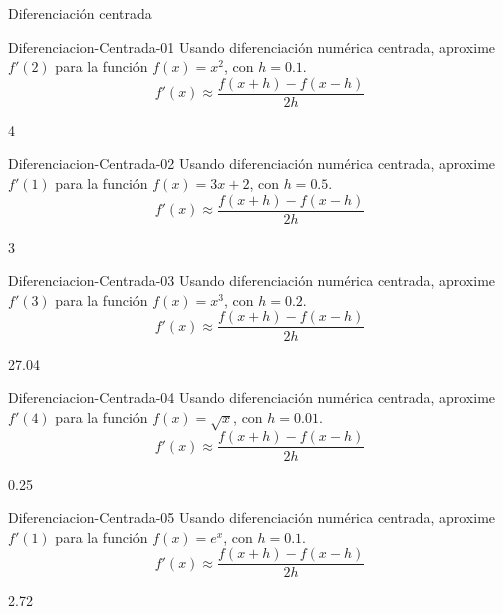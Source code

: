 \documentclass[a4,11pt]{aleph-notas}
\begin{document}
\begin{quiz}{Diferenciación centrada}
\begin{numerical}[tolerance=0.01]%
    {Diferenciacion-Centrada-01}
    Usando diferenciación numérica centrada, aproxime \( f'(2) \) para la función \( f(x)=x^2 \), con \( h=0.1 \).
    \[
        f'(x)\approx \frac{f(x+h)-f(x-h)}{2h}
    \]
    \item 4
\end{numerical}

\begin{numerical}[tolerance=0.01]%
    {Diferenciacion-Centrada-02}
    Usando diferenciación numérica centrada, aproxime \( f'(1) \) para la función \( f(x)=3x+2 \), con \( h=0.5 \).
    \[
        f'(x)\approx \frac{f(x+h)-f(x-h)}{2h}
    \]
    \item 3
\end{numerical}

\begin{numerical}[tolerance=0.01]%
    {Diferenciacion-Centrada-03}
    Usando diferenciación numérica centrada, aproxime \( f'(3) \) para la función \( f(x)=x^3 \), con \( h=0.2 \).
    \[
        f'(x)\approx \frac{f(x+h)-f(x-h)}{2h}
    \]
    \item 27.04
\end{numerical}

\begin{numerical}[tolerance=0.01]%
    {Diferenciacion-Centrada-04}
    Usando diferenciación numérica centrada, aproxime \( f'(4) \) para la función \( f(x)=\sqrt{x} \), con \( h=0.01 \).
    \[
        f'(x)\approx \frac{f(x+h)-f(x-h)}{2h}
    \]
    \item 0.25
\end{numerical}

\begin{numerical}[tolerance=0.01]%
    {Diferenciacion-Centrada-05}
    Usando diferenciación numérica centrada, aproxime \( f'(1) \) para la función \( f(x)=e^x \), con \( h=0.1 \).
    \[
        f'(x)\approx \frac{f(x+h)-f(x-h)}{2h}
    \]
    \item 2.72
\end{numerical}

\end{quiz}
\end{document}
